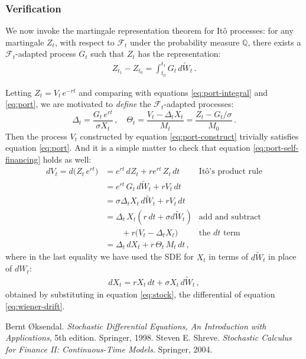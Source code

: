 \documentclass[12pt]{article}
\newcommand{\sF}{\mathcal{F}}
\newcommand{\PQ}{\mathbb{Q}}
\begin{document}
\subsubsection{Verification}

We now invoke the martingale representation theorem for It\^o processes:
for any martingale $Z_t$, with respect to $\sF_t$ under
the probability measure $\PQ$, 
there exists a $\sF_t$-adapted process $G_t$
such that $Z_t$ has the representation:
\begin{align*}
Z_{t_1} - Z_{t_0} = \int_{t_0}^{t_1} G_t \, d\widetilde{W}_t\,.
\end{align*}

Letting $Z_t = V_t \, e^{-rt}$ and 
comparing with equations \eqref{eq:port-integral}
and \eqref{eq:port},
we are motivated to \emph{define}
the $\sF_t$-adapted processes:
\[
\Delta_t = \frac{G_t \, e^{rt}}{\sigma X_t}\,,
\quad \Theta_t = \frac{V_t - \Delta_t X_t}{M_t} = \frac{Z_t - G_t/\sigma}{M_0}\,.
\]
Then the process $V_t$ constructed
by equation \eqref{eq:port-construct}
trivially satisfies equation \eqref{eq:port}.
And it is a simple matter to check that 
equation \eqref{eq:port-self-financing} holds as well:
\begin{align*}
d V_t = d\bigl( Z_t \, e^{rt} \bigr) 
&= e^{rt} \, dZ_t + re^{rt} \, Z_t \, dt & \text{It\^o's product rule}\\
&= e^{rt} \, G_t \, d\widetilde{W}_t  + r V_t \, dt \\
&= \sigma \Delta_t X_t \, d\widetilde{W}_t + rV_t \, dt \\
&= \Delta_t \, X_t (r \, dt + \sigma d\widetilde{W}_t) 
& \text{add and subtract}
\\
& \qquad + r\bigl( V_t - \Delta_t X_t \bigr) 
& \text{the $dt$ term} \\
&= \Delta_t \, dX_t + r \, \Theta_t \, M_t \, dt\,,
\end{align*}
where in the last equality we have used the SDE for $X_t$
in terms of $d\widetilde{W}_t$ in place of $dW_t$:
\begin{align*}
dX_t = r X_t \, dt + \sigma X_t \, d\widetilde{W}_t\,,
\end{align*}
obtained by substituting 
in equation \eqref{eq:stock},
the differential of equation \eqref{eq:wiener-drift}.

\begin{thebibliography}{6}
Bernt \O{}ksendal.
\emph{Stochastic Differential Equations,
An Introduction with Applications}, 5th edition. Springer, 1998.
Steven E. Shreve. \emph{Stochastic Calculus for Finance II: 
Continuous-Time Models}. Springer, 2004.
\end{thebibliography}

\end{document}
